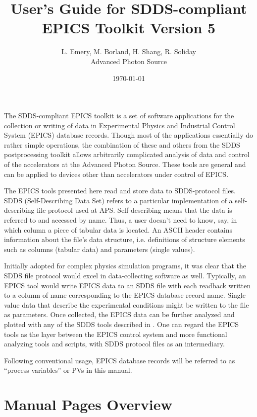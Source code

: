 \documentclass[11pt]{article}
\begin{document}
\title{User's Guide for SDDS-compliant EPICS Toolkit Version 5}
\author{L. Emery, M. Borland, H. Shang, R. Soliday\\Advanced Photon Source\\ \date{\today}}
\maketitle

The SDDS-compliant EPICS toolkit is a set of software applications for
the collection or writing of data in Experimental Physics and
Industrial Control System (EPICS) database records.  Though most of
the applications essentially do rather simple operations, the
combination of these and others from the SDDS postprocessing toolkit
allows arbitrarily complicated analysis of data and control of the
accelerators at the Advanced Photon Source. These tools are general
and can be applied to devices other than accelerators under control of
EPICS.

The EPICS tools presented here read and store data to SDDS-protocol
files.  SDDS (Self-Describing Data Set)\cite{SDDS_AP1.4} refers to a
particular implementation of a self-describing file protocol used at
APS. Self-describing means that the data is referred to and accessed by
name. Thus, a user doesn't need to know, say, in which column a piece
of tabular data is located. An ASCII header contains information about the
file's data structure, i.e. definitions of structure elements
such as columns (tabular data) and parameters (single values).

Initially adopted for complex physics simulation programs, it was clear
that the SDDS file protocol would excel in data-collecting software as
well. Typically, an EPICS tool would write EPICS data to an SDDS file with
each readback written to a column of name corresponding to the
EPICS database record name. Single value data that describe the experimental conditions
might be written to the file as parameters.
Once collected, the EPICS data can be further analyzed and plotted
with any of the SDDS tools described in \cite{SDDS_AP1.4}.
One can regard the EPICS tools as the layer between the EPICS
control system and more functional analyzing tools and scripts, with
SDDS protocol files as an intermediary.

Following conventional usage, EPICS database records will be referred
to as ``process variables'' or PVs in this manual.

\section{Manual Pages Overview}
\end{document}
